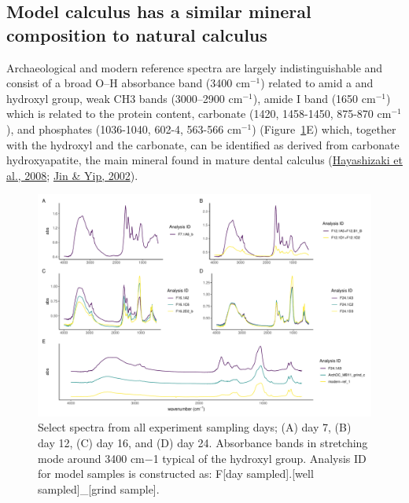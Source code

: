 \documentclass[
  b5paper,
]{book}
\begin{document}
\hypertarget{model-calculus-has-a-similar-mineral-composition-to-natural-calculus}{%
\subsection{Model calculus has a similar mineral composition to natural
calculus}\label{model-calculus-has-a-similar-mineral-composition-to-natural-calculus}}

Archaeological and modern reference spectra are largely
indistinguishable and consist of a broad O--H absorbance band (3400
cm\(^{-1}\)) related to amid a and hydroxyl group, weak CH3 bands
(3000--2900 cm\(^{-1}\)), amide I band (1650 cm\(^{-1}\)) which is
related to the protein content, carbonate (1420, 1458-1450, 875-870
cm\(^{-1}\)), and phosphates (1036-1040, 602-4, 563-566 cm\(^{-1}\))
(Figure~\ref{fig-ftir-spectra}E) which, together with the hydroxyl and
the carbonate, can be identified as derived from carbonate
hydroxyapatite, the main mineral found in mature dental calculus
(\protect\hyperlink{ref-hayashizakiSiteSpecific2008}{Hayashizaki et al.,
2008}; \protect\hyperlink{ref-jinSupragingivalCalculus2002}{Jin \& Yip,
2002}).

\begin{figure}

{\centering \includegraphics{figures/byoc-valid-fig-ftir-spectra-1.pdf}

}

\caption{\label{fig-ftir-spectra}Select spectra from all experiment
sampling days; (A) day 7, (B) day 12, (C) day 16, and (D) day 24.
Absorbance bands in stretching mode around 3400 cm−1 typical of the
hydroxyl group. Analysis ID for model samples is constructed as: F{[}day
sampled{]}.{[}well sampled{]}\_{[}grind sample{]}.}

\end{figure}
\end{document}
